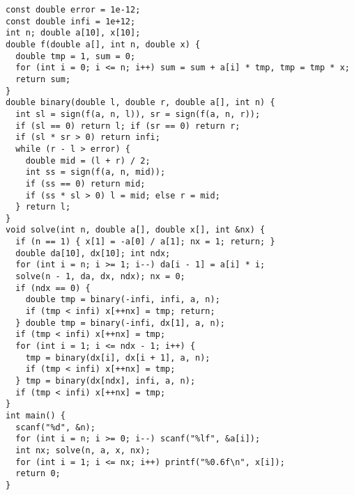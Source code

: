 \begin{lstlisting}
const double error = 1e-12;
const double infi = 1e+12;
int n; double a[10], x[10];
double f(double a[], int n, double x) {
  double tmp = 1, sum = 0;
  for (int i = 0; i <= n; i++) sum = sum + a[i] * tmp, tmp = tmp * x;
  return sum;
}
double binary(double l, double r, double a[], int n) {
  int sl = sign(f(a, n, l)), sr = sign(f(a, n, r));
  if (sl == 0) return l; if (sr == 0) return r;
  if (sl * sr > 0) return infi;
  while (r - l > error) {
    double mid = (l + r) / 2;
    int ss = sign(f(a, n, mid));
    if (ss == 0) return mid;
    if (ss * sl > 0) l = mid; else r = mid;
  } return l;
}
void solve(int n, double a[], double x[], int &nx) {
  if (n == 1) { x[1] = -a[0] / a[1]; nx = 1; return; }
  double da[10], dx[10]; int ndx;
  for (int i = n; i >= 1; i--) da[i - 1] = a[i] * i;
  solve(n - 1, da, dx, ndx); nx = 0;
  if (ndx == 0) {
    double tmp = binary(-infi, infi, a, n);
    if (tmp < infi) x[++nx] = tmp; return;
  } double tmp = binary(-infi, dx[1], a, n);
  if (tmp < infi) x[++nx] = tmp;
  for (int i = 1; i <= ndx - 1; i++) {
    tmp = binary(dx[i], dx[i + 1], a, n);
    if (tmp < infi) x[++nx] = tmp;
  } tmp = binary(dx[ndx], infi, a, n);
  if (tmp < infi) x[++nx] = tmp;
}
int main() {
  scanf("%d", &n);
  for (int i = n; i >= 0; i--) scanf("%lf", &a[i]);
  int nx; solve(n, a, x, nx);
  for (int i = 1; i <= nx; i++) printf("%0.6f\n", x[i]);
  return 0;
}
\end{lstlisting}